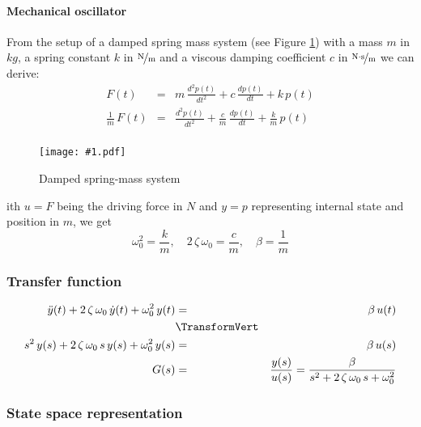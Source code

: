 \documentclass[a4paper,12pt]{article}
\newcommand{\Fig}[4]{%
\begin{figure}[htb]%
\begin{center}%
\texttt{[image: \#1.pdf]}%
\end{center}%
\caption{#3\label{fig:#1}}%
\end{figure}%
}
\newcommand{\FigRef}[1]{Figure \ref{fig:#1}}
\newcommand{\pfrac}[2]{\frac{#1}{#2}}
\newcommand{\SubSubSection}[2]{\subsubsection{#2}\label{subsubsection:#1}}
\begin{document}
\paragraph{Mechanical oscillator}

From the setup of a damped spring mass system (see \FigRef{mechoscil}) with a
mass $m$ in $\unit{kg}$, a spring constant $k$ in $\unitfrac{N}{m}$ and a
viscous damping coefficient $c$ in $\unitfrac{N\cdot s}{m}$ we can derive:
\begin{eqnarray}
F(t)&=&m\,\frac{d^2p(t)}{dt^2}+c\,\frac{dp(t)}{dt}+k\,p(t)\\
\frac{1}{m}\,F(t)&=&\frac{d^2p(t)}{dt^2}+\frac{c}{m}\,\frac{dp(t)}{dt}+\frac{k}{m}\,p(t)\\
\end{eqnarray}

\Fig{mechoscil}{0.5}{Damped spring-mass system}

With $u=F$ being the driving force in $\unit{N}$ and $y=p$ representing
internal state and position in $\unit{m}$, we get
\begin{equation}
\omega_0^2=\pfrac{k}{m},\quad2\,\zeta\,\omega_0=\pfrac{c}{m},\quad\beta=\pfrac{1}{m}
\end{equation}


\SubSubSection{xferfuncA}{Transfer function}

\begin{eqnarray}
\ddot{y}(t)+2\,\zeta\,\omega_0\,\dot{y}(t)+\omega_0^2\,y(t)&=&\beta\,u(t)\\
&\TransformVert&\nonumber\\
s^2\,y(s)+2\,\zeta\,\omega_0\,s\,y(s)+\omega_0^2\,y(s)&=&\beta\,u(s)\\
G(s)&=&\frac{y(s)}{u(s)}=\frac{\beta}{s^2+2\,\zeta\,\omega_0\,s+\omega_0^2}
\end{eqnarray}

\SubSubSection{sspaceA}{State space representation}
\end{document}
